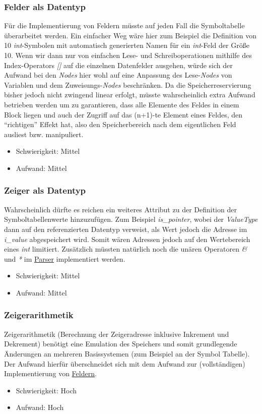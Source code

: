 \documentclass[oneside]{ausarbeitung}
\begin{document}
\subsubsection{Felder als Datentyp}
\label{subsub:arrays}
Für die Implementierung von Feldern müsste auf jeden Fall die Symboltabelle überarbeitet werden. Ein einfacher Weg wäre hier zum Beispiel die Definition von 10 \textit{int}-Symbolen mit automatisch generierten Namen für ein \textit{int}-Feld der Größe 10. Wenn wir dann nur von einfachen Lese- und Schreiboperationen mithilfe des Index-Operators \textit{[]} auf die einzelnen Datenfelder ausgehen, würde sich der Aufwand bei den \textit{Nodes} hier wohl auf eine Anpassung des Lese-\textit{Nodes} von Variablen und dem Zuweisungs-\textit{Nodes} beschränken. Da die Speicherreservierung bisher jedoch nicht zwingend linear erfolgt, müsste wahrscheinlich extra Aufwand betrieben werden um zu garantieren, dass alle Elemente des Feldes in einem Block liegen und auch der Zugriff auf das (n+1)-te Element eines Feldes, den "`richtigen"' Effekt hat, also den Speicherbereich nach dem eigentlichen Feld ausliest bzw. manipuliert.
\begin{itemize}
\item{Schwierigkeit: Mittel}
\item{Aufwand: Mittel}
\end{itemize}
\subsubsection{Zeiger als Datentyp}
Wahrscheinlich dürfte es reichen ein weiteres Attribut zu der Definition der Symboltabellenwerte hinzuzufügen. Zum Beispiel \textit{is\_pointer}, wobei der \textit{ValueType} dann auf den referenzierten Datentyp verweist, als Wert jedoch die Adresse im \textit{i\_value} abgespeichert wird. Somit wären Adressen jedoch auf den Wertebereich eines \textit{int} limitiert. Zusätzlich müssten natürlich noch die unären Operatoren \textit{\&} und \textit{*} im  \hyperref[sub:parser]{Parser} implementiert werden.
\begin{itemize}
\item{Schwierigkeit: Mittel}
\item{Aufwand: Mittel}
\end{itemize}
\subsubsection{Zeigerarithmetik}
Zeigerarithmetik (Berechnung der Zeigeradresse inklusive Inkrement und Dekrement) benötigt eine Emulation des Speichers und somit grundlegende Änderungen an mehreren Basissystemen (zum Beispiel an der Symbol Tabelle). Der Aufwand hierfür überschneidet sich mit dem Aufwand zur (vollständigen) Implementierung von \hyperref[subsub:arrays]{Feldern}.
\begin{itemize}
\item{Schwierigkeit: Hoch}
\item{Aufwand: Hoch}
\end{itemize}
\end{document}
